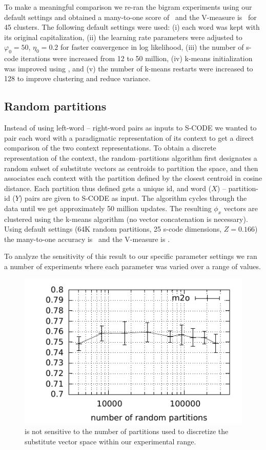 To make a meaningful comparison we re-ran the bigram experiments using
our default settings and obtained a many-to-one score of \bgmto\ 
and the V-measure is \bgvm\  for 45 clusters.  The following
default settings were used: (i) each word was kept with its original
capitalization, (ii) the learning rate parameters were adjusted to
$\varphi_0=50$, $\eta_0=0.2$ for faster convergence in log likelihood,
(iii) the number of s-code iterations were increased from 12 to 50
million, (iv) k-means initialization was improved using
\cite{arthur2007k}, and (v) the number of k-means restarts were
increased to 128 to improve clustering and reduce variance.

\subsection{Random partitions}\label{sec:rpart}

Instead of using left-word -- right-word pairs as inputs to S-CODE we
wanted to pair each word with a paradigmatic representation of its
context to get a direct comparison of the two context representations.
To obtain a discrete representation of the context, the
random--partitions algorithm first designates a random subset of
substitute vectors as centroids to partition the space, and then
associates each context with the partition defined by the closest
centroid in cosine distance.  Each partition thus defined gets a
unique id, and word ($X$) -- partition-id ($Y$) pairs are given to
S-CODE as input.  The algorithm cycles through the data until we get
approximately 50 million updates.  The resulting $\phi_x$ vectors are
clustered using the k-means algorithm (no vector concatenation is
necessary).  Using default settings (64K random partitions, 25 s-code
dimensions, $Z=0.166$) the many-to-one accuracy is \rpmto\ and
the V-measure is \rpvm.

To analyze the sensitivity of this result to our specific parameter
settings we ran a number of experiments where each parameter was
varied over a range of values.

\begin{figure}[ht] \centering
\includegraphics[width=0.5\linewidth]{plot-p.pdf}
\caption{\mto is not sensitive to the number of partitions used to
  discretize the substitute vector space within our experimental
  range.}
\label{plot-p}
\end{figure}

